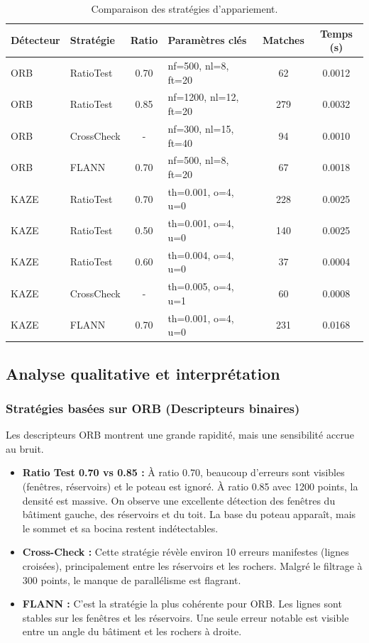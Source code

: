 \documentclass[11pt,a4paper]{article}
\begin{document}
\begin{table}[h!]
\centering
\small
\begin{tabular}{|l|l|c|l|c|c|}
\hline
\textbf{Détecteur} & \textbf{Stratégie} & \textbf{Ratio} & \textbf{Paramètres clés} & \textbf{Matches} & \textbf{Temps (s)} \\ \hline
ORB & RatioTest & 0.70 & nf=500, nl=8, ft=20 & 62 & 0.0012 \\ \hline
ORB & RatioTest & 0.85 & nf=1200, nl=12, ft=20 & 279 & 0.0032 \\ \hline
ORB & CrossCheck & - & nf=300, nl=15, ft=40 & 94 & 0.0010 \\ \hline
ORB & FLANN & 0.70 & nf=500, nl=8, ft=20 & 67 & 0.0018 \\ \hline
KAZE & RatioTest & 0.70 & th=0.001, o=4, u=0 & 228 & 0.0025 \\ \hline
KAZE & RatioTest & 0.50 & th=0.001, o=4, u=0 & 140 & 0.0025 \\ \hline
KAZE & RatioTest & 0.60 & th=0.004, o=4, u=0 & 37 & 0.0004 \\ \hline
KAZE & CrossCheck & - & th=0.005, o=4, u=1 & 60 & 0.0008 \\ \hline
KAZE & FLANN & 0.70 & th=0.001, o=4, u=0 & 231 & 0.0168 \\ \hline
\end{tabular}
\caption{Comparaison des stratégies d'appariement.}
\label{tab:results_q8}
\end{table}

\subsection{Analyse qualitative et interprétation}

\subsubsection{Stratégies basées sur ORB (Descripteurs binaires)}

Les descripteurs ORB montrent une grande rapidité, mais une sensibilité accrue au bruit.

\begin{itemize}
    \item \textbf{Ratio Test 0.70 vs 0.85 :} À ratio 0.70, beaucoup d'erreurs sont visibles (fenêtres, réservoirs) et le poteau est ignoré. À ratio 0.85 avec 1200 points, la densité est massive. On observe une excellente détection des fenêtres du bâtiment gauche, des réservoirs et du toit. La base du poteau apparaît, mais le sommet et sa bocina restent indétectables.
    \item \textbf{Cross-Check :} Cette stratégie révèle environ 10 erreurs manifestes (lignes croisées), principalement entre les réservoirs et les rochers. Malgré le filtrage à 300 points, le manque de parallélisme est flagrant.
    \item \textbf{FLANN :} C'est la stratégie la plus cohérente pour ORB. Les lignes sont stables sur les fenêtres et les réservoirs. Une seule erreur notable est visible entre un angle du bâtiment et les rochers à droite.
\end{itemize}
\end{document}
